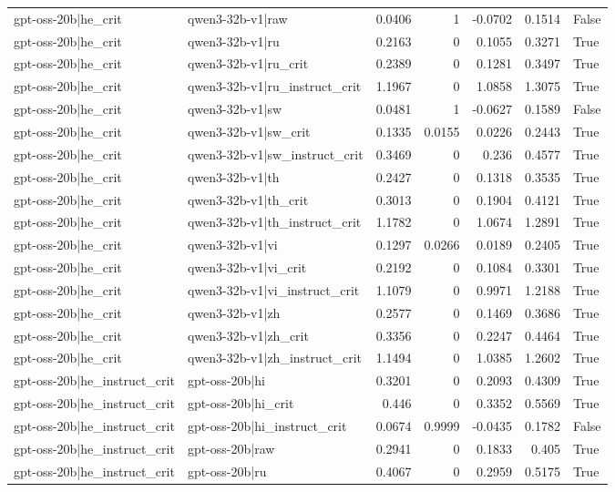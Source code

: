 \begin{table}
\begin{tabular}{l l r r r r l}
gpt-oss-20b|he_crit & qwen3-32b-v1|raw & 0.0406 & 1 & -0.0702 & 0.1514 & False \\
gpt-oss-20b|he_crit & qwen3-32b-v1|ru & 0.2163 & 0 & 0.1055 & 0.3271 & True \\
gpt-oss-20b|he_crit & qwen3-32b-v1|ru_crit & 0.2389 & 0 & 0.1281 & 0.3497 & True \\
gpt-oss-20b|he_crit & qwen3-32b-v1|ru_instruct_crit & 1.1967 & 0 & 1.0858 & 1.3075 & True \\
gpt-oss-20b|he_crit & qwen3-32b-v1|sw & 0.0481 & 1 & -0.0627 & 0.1589 & False \\
gpt-oss-20b|he_crit & qwen3-32b-v1|sw_crit & 0.1335 & 0.0155 & 0.0226 & 0.2443 & True \\
gpt-oss-20b|he_crit & qwen3-32b-v1|sw_instruct_crit & 0.3469 & 0 & 0.236 & 0.4577 & True \\
gpt-oss-20b|he_crit & qwen3-32b-v1|th & 0.2427 & 0 & 0.1318 & 0.3535 & True \\
gpt-oss-20b|he_crit & qwen3-32b-v1|th_crit & 0.3013 & 0 & 0.1904 & 0.4121 & True \\
gpt-oss-20b|he_crit & qwen3-32b-v1|th_instruct_crit & 1.1782 & 0 & 1.0674 & 1.2891 & True \\
gpt-oss-20b|he_crit & qwen3-32b-v1|vi & 0.1297 & 0.0266 & 0.0189 & 0.2405 & True \\
gpt-oss-20b|he_crit & qwen3-32b-v1|vi_crit & 0.2192 & 0 & 0.1084 & 0.3301 & True \\
gpt-oss-20b|he_crit & qwen3-32b-v1|vi_instruct_crit & 1.1079 & 0 & 0.9971 & 1.2188 & True \\
gpt-oss-20b|he_crit & qwen3-32b-v1|zh & 0.2577 & 0 & 0.1469 & 0.3686 & True \\
gpt-oss-20b|he_crit & qwen3-32b-v1|zh_crit & 0.3356 & 0 & 0.2247 & 0.4464 & True \\
gpt-oss-20b|he_crit & qwen3-32b-v1|zh_instruct_crit & 1.1494 & 0 & 1.0385 & 1.2602 & True \\
gpt-oss-20b|he_instruct_crit & gpt-oss-20b|hi & 0.3201 & 0 & 0.2093 & 0.4309 & True \\
gpt-oss-20b|he_instruct_crit & gpt-oss-20b|hi_crit & 0.446 & 0 & 0.3352 & 0.5569 & True \\
gpt-oss-20b|he_instruct_crit & gpt-oss-20b|hi_instruct_crit & 0.0674 & 0.9999 & -0.0435 & 0.1782 & False \\
gpt-oss-20b|he_instruct_crit & gpt-oss-20b|raw & 0.2941 & 0 & 0.1833 & 0.405 & True \\
gpt-oss-20b|he_instruct_crit & gpt-oss-20b|ru & 0.4067 & 0 & 0.2959 & 0.5175 & True \\

\end{tabular}
\end{table}
